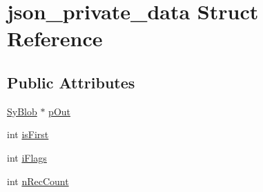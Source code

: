 \hypertarget{structjson__private__data}{\section{json\-\_\-private\-\_\-data Struct Reference}
\label{d0/d9b/structjson__private__data}
}
\subsection*{Public Attributes}
\begin{DoxyCompactItemize}
\item 
\hyperlink{struct_sy_blob}{Sy\-Blob} $\ast$ \hyperlink{structjson__private__data_ae61243ee18a6b856f1e057c3a8ba7b2d}{p\-Out}
\item 
int \hyperlink{structjson__private__data_a23df689575317d0c3489cc16a909199b}{is\-First}
\item 
int \hyperlink{structjson__private__data_a8dbc4f764b916c1519c72a119da212e8}{i\-Flags}
\item 
int \hyperlink{structjson__private__data_a4216dc3c7d91aff453a6081fa11876a3}{n\-Rec\-Count}
\end{DoxyCompactItemize}


